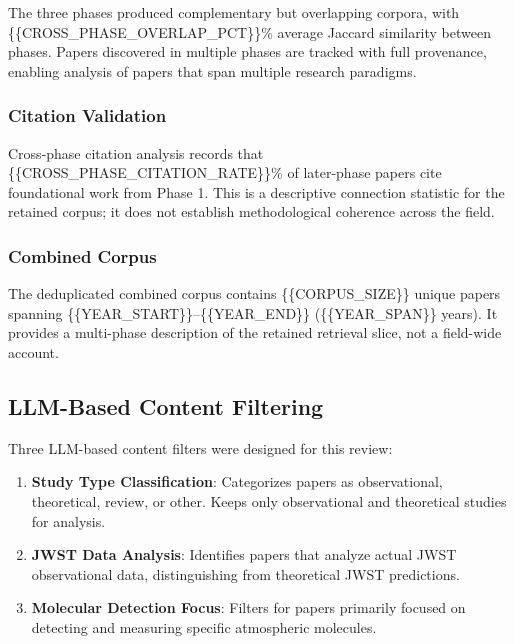 \documentclass[
]{article}
\begin{document}
The three phases produced complementary but overlapping corpora, with
\{\{CROSS\_PHASE\_OVERLAP\_PCT\}\}\% average Jaccard similarity between
phases. Papers discovered in multiple phases are tracked with full
provenance, enabling analysis of papers that span multiple research
paradigms.

\subsubsection{Citation Validation}\label{citation-validation}

Cross-phase citation analysis records that
\{\{CROSS\_PHASE\_CITATION\_RATE\}\}\% of later-phase papers cite
foundational work from Phase 1. This is a descriptive connection
statistic for the retained corpus; it does not establish methodological
coherence across the field.

\subsubsection{Combined Corpus}\label{combined-corpus}

The deduplicated combined corpus contains \{\{CORPUS\_SIZE\}\} unique
papers spanning \{\{YEAR\_START\}\}--\{\{YEAR\_END\}\}
(\{\{YEAR\_SPAN\}\} years). It provides a multi-phase description of the
retained retrieval slice, not a field-wide account.

\subsection{LLM-Based Content
Filtering}\label{llm-based-content-filtering}

Three LLM-based content filters were designed for this review:

\begin{enumerate}
\def\labelenumi{\arabic{enumi}.}
\item
  \textbf{Study Type Classification}: Categorizes papers as
  observational, theoretical, review, or other. Keeps only observational
  and theoretical studies for analysis.
\item
  \textbf{JWST Data Analysis}: Identifies papers that analyze actual
  JWST observational data, distinguishing from theoretical JWST
  predictions.
\item
  \textbf{Molecular Detection Focus}: Filters for papers primarily
  focused on detecting and measuring specific atmospheric molecules.
\end{enumerate}
\end{document}
